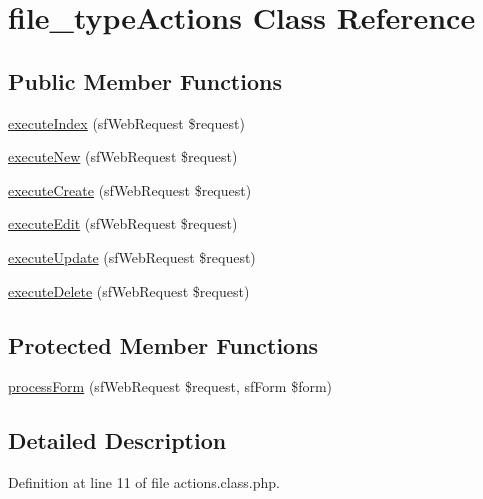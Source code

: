 \hypertarget{classfile__type_actions}{\section{file\-\_\-type\-Actions Class Reference}
\label{classfile__type_actions}
}
\subsection*{Public Member Functions}
\begin{DoxyCompactItemize}
\item 
\hyperlink{classfile__type_actions_a948cc911eb1d9f77990be54af3b2080f}{execute\-Index} (sf\-Web\-Request \$request)
\item 
\hyperlink{classfile__type_actions_a0ffbea56560c6c633dae68ec22aff21c}{execute\-New} (sf\-Web\-Request \$request)
\item 
\hyperlink{classfile__type_actions_a75837617743fb64dca82d8133b2c662a}{execute\-Create} (sf\-Web\-Request \$request)
\item 
\hyperlink{classfile__type_actions_af4d8fedd4b28f3398826a1bb8fa54394}{execute\-Edit} (sf\-Web\-Request \$request)
\item 
\hyperlink{classfile__type_actions_af7b4f51862add3c2ebb54efc136a0840}{execute\-Update} (sf\-Web\-Request \$request)
\item 
\hyperlink{classfile__type_actions_a52b5b11b11a0070dd2662257520c045a}{execute\-Delete} (sf\-Web\-Request \$request)
\end{DoxyCompactItemize}
\subsection*{Protected Member Functions}
\begin{DoxyCompactItemize}
\item 
\hyperlink{classfile__type_actions_a7cf661d837626e0320753cbffa019a01}{process\-Form} (sf\-Web\-Request \$request, sf\-Form \$form)
\end{DoxyCompactItemize}


\subsection{Detailed Description}


Definition at line 11 of file actions.\-class.\-php.



